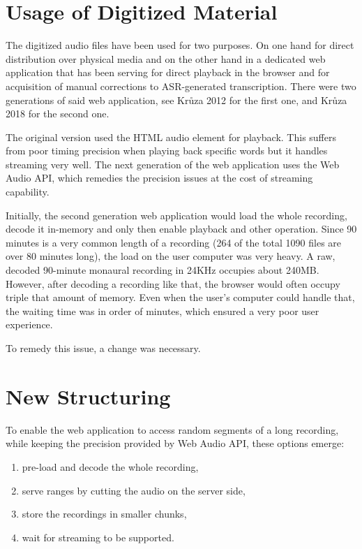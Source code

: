 \documentclass{llncs}
\begin{document}
\section{Usage of Digitized Material}

The digitized audio files have been used for two purposes. On one hand for
direct distribution over physical media and on the other hand in a dedicated web
application that has been serving for direct playback in the browser and for
acquisition of manual corrections to ASR-generated\cite{ircing2001large} transcription. There were
two generations of said web application, see Krůza 2012\cite{kruuza2012making} for the first one,
and Krůza 2018\cite{biblio:KrKuSecondGenerationWeb2018} for the second one.

The original version used the HTML audio element for playback. This suffers from
poor timing precision when playing back specific words but it handles streaming
very well. The next generation of the web application uses the Web Audio API,
which remedies the precision issues at the cost of streaming capability.

Initially, the second generation web application would load the whole recording,
decode it in-memory and only then enable playback and other operation. Since 90
minutes is a very common length of a recording (264 of the total 1090 files are
over 80 minutes long), the load on the user computer was very heavy. A raw,
decoded 90-minute monaural recording in 24KHz occupies about 240MB. However,
after decoding a recording like that, the browser would often occupy triple that
amount of memory. Even when the user's computer could handle that, the waiting
time was in order of minutes, which ensured a very poor user experience.

To remedy this issue, a change was necessary.

\section{New Structuring}

To enable the web application to access random segments of a long recording, while keeping the precision provided by Web Audio API, these options emerge: 
\begin{enumerate}
    \item{pre-load and decode the whole recording,}
    \item{serve ranges by cutting the audio on the server side,}
    \item{store the recordings in smaller chunks,}
    \item{wait for streaming to be supported.}
\end{enumerate}
\end{document}

